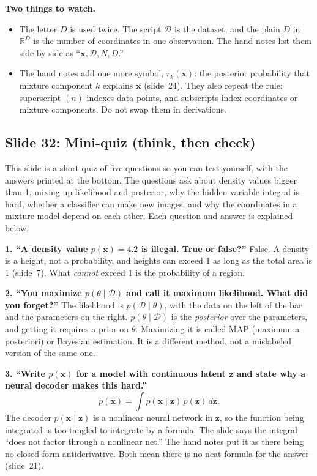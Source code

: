 \textbf{Two things to watch.}
\begin{itemize}
\item The letter $D$ is used twice. The script $\mathcal{D}$ is the dataset, and the plain $D$ in $\mathbb{R}^D$ is the number of coordinates in one observation. The hand notes list them side by side as ``$\mathbf{x},\mathcal{D},N,D$.''
\item The hand notes add one more symbol, $r_k(\mathbf{x})$: the posterior probability that mixture component $k$ explains $\mathbf{x}$ (slide~24). They also repeat the rule: superscript $(n)$ indexes data points, and subscripts index coordinates or mixture components. Do not swap them in derivations.
\end{itemize}

\subsection*{Slide 32: Mini-quiz (think, then check)}

This slide is a short quiz of five questions so you can test yourself, with the answers printed at the bottom. The questions ask about density values bigger than 1, mixing up likelihood and posterior, why the hidden-variable integral is hard, whether a classifier can make new images, and why the coordinates in a mixture model depend on each other. Each question and answer is explained below.

\textbf{1. ``A density value $p(\mathbf{x})=4.2$ is illegal. True or false?''} False. A density is a height, not a probability, and heights can exceed 1 as long as the total area is 1 (slide~7). What \textit{cannot} exceed 1 is the probability of a region.

\textbf{2. ``You maximize $p(\theta\mid\mathcal{D})$ and call it maximum likelihood. What did you forget?''} The likelihood is $p(\mathcal{D}\mid\theta)$, with the data on the left of the bar and the parameters on the right. $p(\theta\mid\mathcal{D})$ is the \textit{posterior} over the parameters, and getting it requires a prior on $\theta$. Maximizing it is called MAP (maximum a posteriori) or Bayesian estimation. It is a different method, not a mislabeled version of the same one.

\textbf{3. ``Write $p(\mathbf{x})$ for a model with continuous latent $\mathbf{z}$ and state why a neural decoder makes this hard.''}
\[
p(\mathbf{x})=\int p(\mathbf{x}\mid\mathbf{z})\,p(\mathbf{z})\,d\mathbf{z}.
\]
The decoder $p(\mathbf{x}\mid\mathbf{z})$ is a nonlinear neural network in $\mathbf{z}$, so the function being integrated is too tangled to integrate by a formula. The slide says the integral ``does not factor through a nonlinear net.'' The hand notes put it as there being no closed-form antiderivative. Both mean there is no neat formula for the answer (slide~21).

